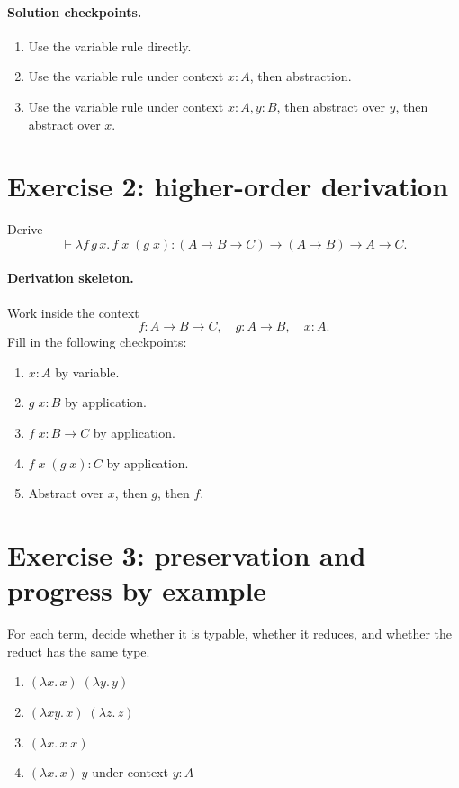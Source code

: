 \documentclass[11pt]{article}
\newcommand{\lam}[1]{\lambda #1.\,}
\begin{document}
\paragraph{Solution checkpoints.}
\begin{enumerate}[nosep]
  \item Use the variable rule directly.
  \item Use the variable rule under context $x:A$, then abstraction.
  \item Use the variable rule under context $x:A,y:B$, then abstract over $y$, then abstract over $x$.
\end{enumerate}

\section*{Exercise 2: higher-order derivation}
Derive
\[
  \vdash \lam{f\,g\,x} f\;x\;(g\;x)
  : (A \to B \to C) \to (A \to B) \to A \to C .
\]

\paragraph{Derivation skeleton.}
Work inside the context
\[
  f : A \to B \to C,
  \quad g : A \to B,
  \quad x : A.
\]
Fill in the following checkpoints:
\begin{enumerate}[nosep]
  \item $x : A$ by variable.
  \item $g\;x : B$ by application.
  \item $f\;x : B \to C$ by application.
  \item $f\;x\;(g\;x) : C$ by application.
  \item Abstract over $x$, then $g$, then $f$.
\end{enumerate}

\section*{Exercise 3: preservation and progress by example}
For each term, decide whether it is typable, whether it reduces, and whether the reduct has the same type.
\begin{enumerate}
  \item $(\lam{x}x)\;(\lam{y}y)$
  \item $(\lam{x y}x)\;(\lam{z}z)$
  \item $(\lam{x}x\;x)$
  \item $(\lam{x}x)\;y$ under context $y:A$
\end{enumerate}
\end{document}
